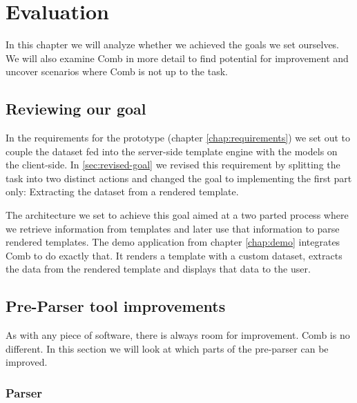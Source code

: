\documentclass[thesis.tex]{subfiles}
\begin{document}
\chapter{Evaluation}
\label{chap:eval}


In this chapter we will analyze whether we achieved the goals we set ourselves.
We will also examine Comb in more detail to find potential for improvement and
uncover scenarios where Comb is not up to the task.

\section{Reviewing our goal}
In the requirements for the prototype (chapter \ref{chap:requirements})
we set out to couple the dataset fed into the server-side template engine with
the models on the client-side. In \ref{sec:revised-goal} we revised this
requirement by splitting the task into two distinct actions and changed the goal
to implementing the first part only: Extracting the dataset from a rendered
template.

The architecture we set to achieve this goal aimed at a two parted process where
we retrieve information from templates and later use that information to parse
rendered templates. The demo application from chapter \ref{chap:demo}
integrates Comb to do exactly that. It renders a template with a custom dataset,
extracts the data from the rendered template and displays that data to the user.

\section{Pre-Parser tool improvements}
As with any piece of software, there is always room for improvement.
Comb is no different. In this section we will look at which parts of the
pre-parser can be improved.

\subsection{Parser}
\end{document}

